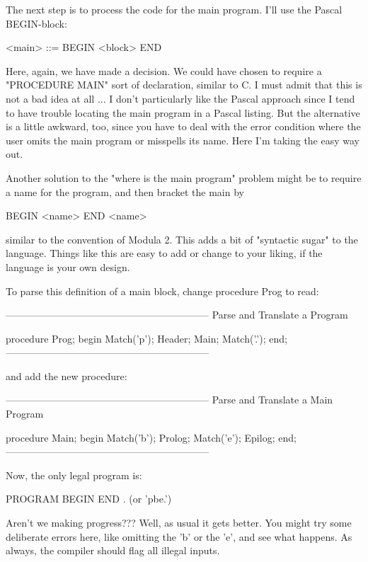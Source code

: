 \documentclass[float=false, crop=false]{standalone}
\begin{document}
The next step is to process the code for the main program. I'll use the Pascal
BEGIN-block:


     <main> ::= BEGIN <block> END


Here, again, we have made a decision. We could have chosen to require a
"PROCEDURE MAIN" sort of declaration, similar to C. I must admit that this is
not a bad idea at all ... I don't particularly like the Pascal approach since I
tend to have trouble locating the main program in a Pascal listing. But the
alternative is a little awkward, too, since you have to deal with the error
condition where the user omits the main program or misspells its name. Here I'm
taking the easy way out.

Another solution to the "where is the main program" problem might be to require
a name for the program, and then bracket the main by


     BEGIN <name>
     END <name>


similar to the convention of Modula 2. This adds a bit of "syntactic sugar" to
the language. Things like this are easy to add or change to your liking, if the
language is your own design.

To parse this definition of a main block, change procedure Prog to read:

\begin{code}
{--------------------------------------------------------------}
{  Parse and Translate a Program }

procedure Prog;
begin
   Match('p');
   Header;
   Main;
   Match('.');
end;
{--------------------------------------------------------------}
\end{code}

and add the new procedure:

\begin{code}
{--------------------------------------------------------------}
{ Parse and Translate a Main Program }

procedure Main;
begin
   Match('b');
   Prolog;
   Match('e');
   Epilog;
end;
{--------------------------------------------------------------}
\end{code}

Now, the only legal program is:


     PROGRAM BEGIN END . (or 'pbe.')


Aren't we making progress??? Well, as usual it gets better. You might try some
deliberate errors here, like omitting the 'b' or the 'e', and see what happens.
As always, the compiler should flag all illegal inputs.
\end{document}
